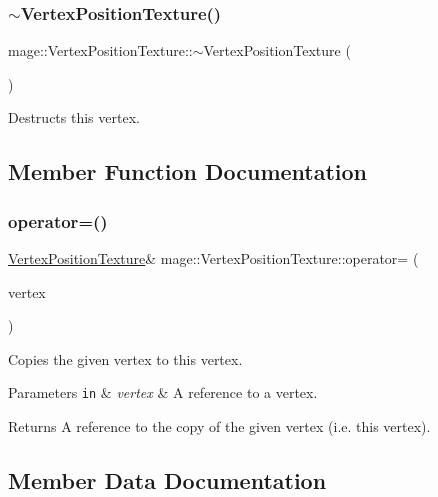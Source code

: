 \subsubsection{\texorpdfstring{$\sim$\+Vertex\+Position\+Texture()}{~VertexPositionTexture()}}
{\footnotesize\ttfamily mage\+::\+Vertex\+Position\+Texture\+::$\sim$\+Vertex\+Position\+Texture (\begin{DoxyParamCaption}{ }\end{DoxyParamCaption})\hspace{0.3cm}{\ttfamily [default]}}

Destructs this vertex. 

\subsection{Member Function Documentation}
\hypertarget{structmage_1_1_vertex_position_texture_adae15e832eaf7624c32865a11d0d8234}{}\label{structmage_1_1_vertex_position_texture_adae15e832eaf7624c32865a11d0d8234} 
\subsubsection{\texorpdfstring{operator=()}{operator=()}}
{\footnotesize\ttfamily \hyperlink{structmage_1_1_vertex_position_texture}{Vertex\+Position\+Texture}\& mage\+::\+Vertex\+Position\+Texture\+::operator= (\begin{DoxyParamCaption}\item[{const \hyperlink{structmage_1_1_vertex_position_texture}{Vertex\+Position\+Texture} \&}]{vertex }\end{DoxyParamCaption})\hspace{0.3cm}{\ttfamily [default]}}

Copies the given vertex to this vertex.


\begin{DoxyParams}[1]{Parameters}
\mbox{\tt in}  & {\em vertex} & A reference to a vertex. \\
\hline
\end{DoxyParams}
\begin{DoxyReturn}{Returns}
A reference to the copy of the given vertex (i.\+e. this vertex). 
\end{DoxyReturn}


\subsection{Member Data Documentation}
\hypertarget{structmage_1_1_vertex_position_texture_afbe5de758f42c05cdb10c493f90b6fca}{}\label{structmage_1_1_vertex_position_texture_afbe5de758f42c05cdb10c493f90b6fca} 
